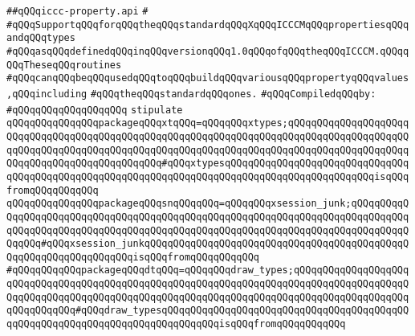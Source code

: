 \label{src/lib/x-kit/xclient/src/iccc/iccc-property.api}
\verb|##qQQqiccc-property.api|\newline
\verb|#|\newline
\verb|#qQQqSupportqQQqforqQQqtheqQQqstandardqQQqXqQQqICCCMqQQqpropertiesqQQqandqQQqtypes|\newline
\verb|#qQQqasqQQqdefinedqQQqinqQQqversionqQQq1.0qQQqofqQQqtheqQQqICCCM.qQQqqQQqTheseqQQqroutines|\newline
\verb|#qQQqcanqQQqbeqQQqusedqQQqtoqQQqbuildqQQqvariousqQQqpropertyqQQqvalues,qQQqincluding|\newline
\verb|#qQQqtheqQQqstandardqQQqones.|\newline
\newline
\verb|#qQQqCompiledqQQqby:|\newline
\verb|#qQQqqQQqqQQqqQQqqQQq|\newline
\newline
\newline
\verb|stipulate|\newline
\verb|qQQqqQQqqQQqqQQqpackageqQQqxtqQQq=qQQqqQQqxtypes;qQQqqQQqqQQqqQQqqQQqqQQqqQQqqQQqqQQqqQQqqQQqqQQqqQQqqQQqqQQqqQQqqQQqqQQqqQQqqQQqqQQqqQQqqQQqqQQqqQQqqQQqqQQqqQQqqQQqqQQqqQQqqQQqqQQqqQQqqQQqqQQqqQQqqQQqqQQqqQQqqQQqqQQqqQQqqQQqqQQqqQQqqQQq#qQQqxtypesqQQqqQQqqQQqqQQqqQQqqQQqqQQqqQQqqQQqqQQqqQQqqQQqqQQqqQQqqQQqqQQqqQQqqQQqqQQqqQQqqQQqqQQqqQQqqQQqisqQQqfromqQQqqQQqqQQq|\newline
\verb|qQQqqQQqqQQqqQQqpackageqQQqsnqQQqqQQq=qQQqqQQqxsession_junk;qQQqqQQqqQQqqQQqqQQqqQQqqQQqqQQqqQQqqQQqqQQqqQQqqQQqqQQqqQQqqQQqqQQqqQQqqQQqqQQqqQQqqQQqqQQqqQQqqQQqqQQqqQQqqQQqqQQqqQQqqQQqqQQqqQQqqQQqqQQqqQQqqQQqqQQqqQQq#qQQqxsession_junkqQQqqQQqqQQqqQQqqQQqqQQqqQQqqQQqqQQqqQQqqQQqqQQqqQQqqQQqqQQqqQQqqQQqisqQQqfromqQQqqQQqqQQq|\newline
\verb|#qQQqqQQqqQQqpackageqQQqdtqQQq=qQQqqQQqdraw_types;qQQqqQQqqQQqqQQqqQQqqQQqqQQqqQQqqQQqqQQqqQQqqQQqqQQqqQQqqQQqqQQqqQQqqQQqqQQqqQQqqQQqqQQqqQQqqQQqqQQqqQQqqQQqqQQqqQQqqQQqqQQqqQQqqQQqqQQqqQQqqQQqqQQqqQQqqQQqqQQqqQQqqQQqqQQq#qQQqdraw_typesqQQqqQQqqQQqqQQqqQQqqQQqqQQqqQQqqQQqqQQqqQQqqQQqqQQqqQQqqQQqqQQqqQQqqQQqqQQqqQQqisqQQqfromqQQqqQQqqQQq|\newline

